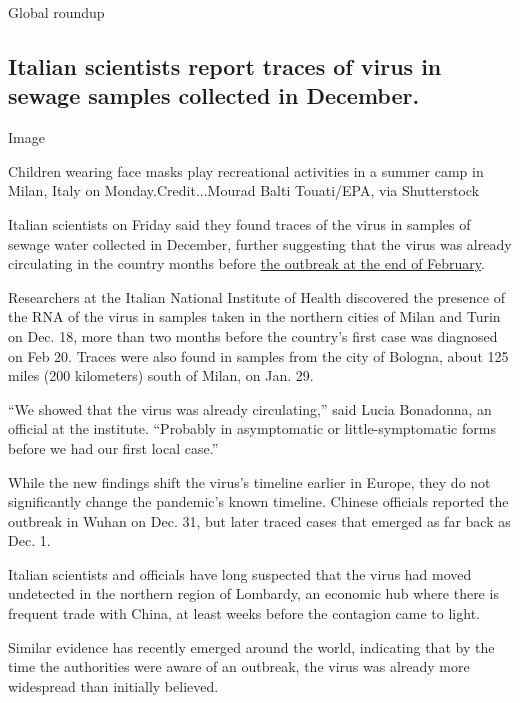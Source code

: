 Global roundup

\hypertarget{italian-scientists-report-traces-of-virus-in-sewage-samples-collected-in-december}{%
\subsection{Italian scientists report traces of virus in sewage samples
collected in
December.}\label{italian-scientists-report-traces-of-virus-in-sewage-samples-collected-in-december}}

Image

Children wearing face masks play recreational activities in a summer
camp in Milan, Italy on Monday.Credit...Mourad Balti Touati/EPA, via
Shutterstock

Italian scientists on Friday said they found traces of the virus in
samples of sewage water collected in December, further suggesting that
the virus was already circulating in the country months before
\href{https://www.nytimes.com/2020/03/21/world/europe/italy-coronavirus-center-lessons.html}{the
outbreak at the end of February}.

Researchers at the Italian National Institute of Health discovered the
presence of the RNA of the virus in samples taken in the northern cities
of Milan and Turin on Dec. 18, more than two months before the country's
first case was diagnosed on Feb 20. Traces were also found in samples
from the city of Bologna, about 125 miles (200 kilometers) south of
Milan, on Jan. 29.

``We showed that the virus was already circulating,'' said Lucia
Bonadonna, an official at the institute. ``Probably in asymptomatic or
little-symptomatic forms before we had our first local case.''

While the new findings shift the virus's timeline earlier in Europe,
they do not significantly change the pandemic's known timeline. Chinese
officials reported the outbreak in Wuhan on Dec. 31, but later traced
cases that emerged as far back as Dec. 1.

Italian scientists and officials have long suspected that the virus had
moved undetected in the northern region of Lombardy, an economic hub
where there is frequent trade with China, at least weeks before the
contagion came to light.

Similar evidence has recently emerged around the world, indicating that
by the time the authorities were aware of an outbreak, the virus was
already more widespread than initially believed.

